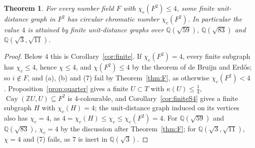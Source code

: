 \documentclass[11pt,a4paper]{amsart}
\newtheorem{theorem}{Theorem}
\theoremstyle{remark}
\newcommand{\Q}{\mathbb{Q}}
\newcommand{\Z}{\mathbb{Z}}
\newcommand{\Cay}{\operatorname{Cay}}
\begin{document}
\begin{theorem}\label{thm:finite4}
For every number field $F$ with $\chi_c(F^2)\le4$, some finite unit-distance graph in $F^2$ has circular chromatic
number $\chi_c(F^2)$. In particular the value $4$ is attained by finite unit-distance graphs over $\Q(\sqrt{59})$,
$\Q(\sqrt{83})$ and $\Q(\sqrt3,\sqrt{11})$.
\end{theorem}

\begin{proof}
Below $4$ this is Corollary~\ref{cor:finite}. If $\chi_c(F^2)=4$, every finite subgraph has $\chi_c\le4$, hence
$\chi\le4$, and $\chi(F^2)\le4$ by the theorem of de Bruijn and Erd\H{o}s; so $i\notin F$, and (a), (b) and (7)
fail by Theorem~\ref{thm:F}, as otherwise $\chi_c(F^2)<4$. Proposition~\ref{prop:quarter} gives a finite $U\subset T$
with $\kappa(U)\le\frac14$, $\Cay(\Z U,U)\subseteq F^2$ is $4$-colourable, and Corollary~\ref{cor:finiteS4} gives a
finite subgraph $H$ with $\chi_c(H)=4$; the unit-distance graph induced on its vertices also has $\chi_c=4$, as
$4=\chi_c(H)\le\chi_c\le\chi_c(F^2)=4$. For $\Q(\sqrt{59})$ and $\Q(\sqrt{83})$, $\chi_c=4$ by the discussion after
Theorem~\ref{thm:F}; for $\Q(\sqrt3,\sqrt{11})$, $\chi=4$ and (7) fails, as $7$ is inert in $\Q(\sqrt3)$.
\end{proof}
\end{document}
